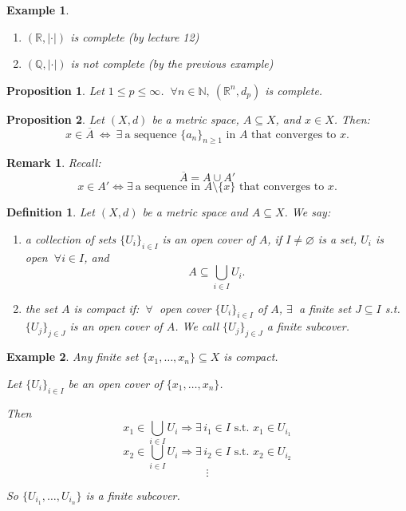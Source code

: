 \documentclass[12pt]{article}
\newtheorem*{remark}{Remark}
\newtheorem{proposition}{Proposition}
\newtheorem{definition}{Definition}
\newtheorem{example}{Example}
\begin{document}
\begin{example}
\begin{enumerate}[label=\textbf{(\arabic*)}]
  \item $(\mathbb{R},|\cdot|)$ is complete (by lecture 12)
  \item $(\mathbb{Q},|\cdot|)$ is not complete (by the previous example)
\end{enumerate}
\end{example}

\begin{proposition}
Let $1\le p\le\infty$. $\ \forall n\in\mathbb{N},\ (\mathbb{R}^n,d_p)$ is
complete.
\end{proposition}

\begin{proposition}
Let $(X,d)$ be a metric space, $A\subseteq X$, and $x\in X$. Then:
\[
x\in\overline{A}\ \Leftrightarrow\ \exists\ \text{a sequence }\{a_n\}_{n\ge 1}
\text{ in } A \text{ that converges to } x.
\]
\end{proposition}

\begin{remark}
Recall:
\[
\overline{A}=A\cup A'
\]
\[
x\in A' \Leftrightarrow \exists\ \text{a sequence in } A\setminus\{x\}
\text{ that converges to } x.
\]
\end{remark}

\begin{definition}
Let $(X,d)$ be a metric space and $A\subseteq X$. We say:
\begin{enumerate}[label=\textbf{(\arabic*)}]
  \item a collection of sets $\{U_i\}_{i\in I}$ is an open cover of $A$, if
  $I\neq\varnothing$ is a set, $U_i$ is open $\ \forall i\in I$, and
  \[
  A\subseteq \bigcup_{i\in I} U_i.
  \]
  \item the set $A$ is compact if: $\ \forall\ $ open cover
  $\{U_i\}_{i\in I}$ of $A$, $\exists\ $ a finite set $J\subseteq I$ s.t.
  $\{U_j\}_{j\in J}$ is an open cover of $A$. We call $\{U_j\}_{j\in J}$ a
  finite subcover.
\end{enumerate}
\end{definition}

\begin{example}
Any finite set $\{x_1,\ldots,x_n\}\subseteq X$ is compact.

Let $\{U_i\}_{i\in I}$ be an open cover of $\{x_1,\ldots,x_n\}$.

Then
\[
x_1\in \bigcup_{i\in I} U_i \Rightarrow \exists\, i_1\in I \text{ s.t. } x_1\in U_{i_1}
\]
\[
x_2\in \bigcup_{i\in I} U_i \Rightarrow \exists\, i_2\in I \text{ s.t. } x_2\in U_{i_2}
\]
\[
\vdots
\]

So $\{U_{i_1},\ldots,U_{i_n}\}$ is a finite subcover.
\end{example}
\end{document}
